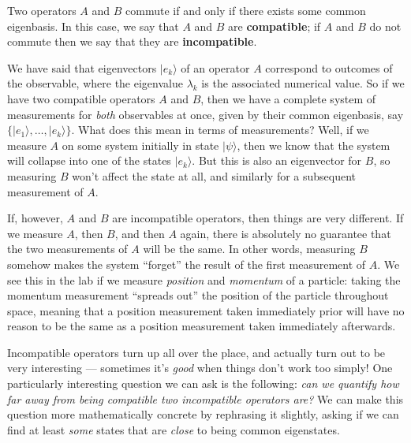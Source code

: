 \documentclass[fleqn,a4paper]{article}
\newenvironment{idea}{\everypar{\setlength{\parindent}{1.5em}}}{}
\theoremstyle{definition}
\theoremstyle{definition}
\theoremstyle{definition}
\theoremstyle{definition}
\theoremstyle{remark}
\begin{document}
\begin{idea}
Two operators \(A\) and \(B\) commute if and only if there exists some common eigenbasis.
In this case, we say that \(A\) and \(B\) are \textbf{compatible}; if \(A\) and \(B\) do not commute then we say that they are \textbf{incompatible}.

\end{idea}

We have said that eigenvectors \(|e_k\rangle\) of an operator \(A\) correspond to outcomes of the observable, where the eigenvalue \(\lambda_k\) is the associated numerical value.
So if we have two compatible operators \(A\) and \(B\), then we have a complete system of measurements for \emph{both} observables at once, given by their common eigenbasis, say \(\{|e_1\rangle,\ldots,|e_k\rangle\}\).
What does this mean in terms of measurements?
Well, if we measure \(A\) on some system initially in state \(|\psi\rangle\), then we know that the system will collapse into one of the states \(|e_k\rangle\).
But this is also an eigenvector for \(B\), so measuring \(B\) won't affect the state at all, and similarly for a subsequent measurement of \(A\).

If, however, \(A\) and \(B\) are incompatible operators, then things are very different.
If we measure \(A\), then \(B\), and then \(A\) again, there is absolutely no guarantee that the two measurements of \(A\) will be the same.
In other words, measuring \(B\) somehow makes the system ``forget'' the result of the first measurement of \(A\).
We see this in the lab if we measure \emph{position} and \emph{momentum} of a particle: taking the momentum measurement ``spreads out'' the position of the particle throughout space, meaning that a position measurement taken immediately prior will have no reason to be the same as a position measurement taken immediately afterwards.

Incompatible operators turn up all over the place, and actually turn out to be very interesting --- sometimes it's \emph{good} when things don't work too simply!
One particularly interesting question we can ask is the following: \emph{can we quantify how far away from being compatible two incompatible operators are?}
We can make this question more mathematically concrete by rephrasing it slightly, asking if we can find at least \emph{some} states that are \emph{close} to being common eigenstates.
\end{document}
